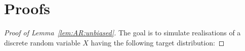 \documentclass[12pt]{article}
\newcommand{\eqsp}{\;}
\newcommand{\1}{\mathrm{1}}
\begin{document}
\section{Proofs}
\label{sec:append:proofs}
\begin{proof}[Proof of Lemma~\ref{lem:AR:unbiased}]
%
The goal is to simulate realisations of  a discrete random variable $X$ having the following target distribution:

\end{proof}
\end{document}
